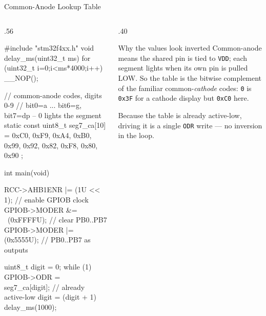 \documentclass[9pt,aspectratio=169,xcolor=table]{beamer}
\begin{document}
\begin{frame}[fragile]{Common-Anode Lookup Table}
    \begin{columns}[T]
    \begin{column}{.56\textwidth}
\begin{cc}[basicstyle=\ttfamily\scriptsize]
#include "stm32f4xx.h"
void delay_ms(uint32_t ms) { for (uint32_t i=0;i<ms*4000;i++) __NOP(); }

// common-anode codes, digits 0-9
// bit0=a ... bit6=g, bit7=dp -- 0 lights the segment
static const uint8_t seg7_ca[10] = {
    0xC0, 0xF9, 0xA4, 0xB0, 0x99,
    0x92, 0x82, 0xF8, 0x80, 0x90
};

int main(void) {
    RCC->AHB1ENR |= (1U << 1);   // enable GPIOB clock
    GPIOB->MODER &= ~(0xFFFFU);  // clear PB0..PB7
    GPIOB->MODER |=  (0x5555U);  // PB0..PB7 as outputs

    uint8_t digit = 0;
    while (1) {
        GPIOB->ODR = seg7_ca[digit];  // already active-low
        digit = (digit + 1) %
        delay_ms(1000);
    }
}
\end{cc}
    \end{column}
    \begin{column}{.40\textwidth}
        \begin{block}{Why the values look inverted}
            \alert{Common-anode} means the shared pin is tied to
            \texttt{VDD}; each segment lights when its own pin is
            pulled \alert{LOW}. So the table is the bitwise complement
            of the familiar common-\emph{cathode} codes: \texttt{0} is
            \texttt{0x3F} for a cathode display but \texttt{0xC0} here.

            \vspace{1mm}
            Because the table is already active-low, driving it is a
            single \texttt{ODR} write --- no inversion in the loop.
        \end{block}
    \end{column}
    \end{columns}
\end{frame}
\end{document}
